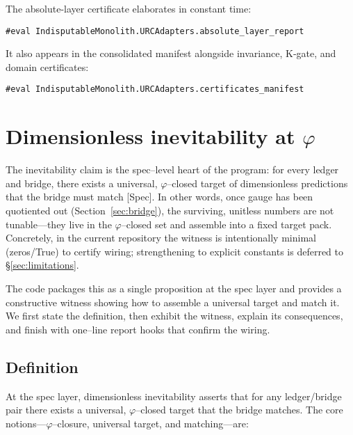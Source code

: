 \documentclass[11pt,a4paper,twoside]{article}
\numberwithin{equation}{section}
\newcommand{\phigr}{\varphi} %
\theoremstyle{customthm}
\theoremstyle{customdef}
\theoremstyle{customrem}
\begin{document}
\noindent The absolute-layer certificate elaborates in constant time:
\begin{lstlisting}
#eval IndisputableMonolith.URCAdapters.absolute_layer_report
\end{lstlisting}

\noindent It also appears in the consolidated manifest alongside invariance, K‑gate, and domain certificates:
\begin{lstlisting}
#eval IndisputableMonolith.URCAdapters.certificates_manifest
\end{lstlisting}

\section{Dimensionless inevitability at $\phigr$}\label{sec:phi}

The inevitability claim is the spec–level heart of the program: for every ledger and bridge, there exists a universal, $\phigr$–closed target of dimensionless predictions that the bridge must match [Spec]. In other words, once gauge has been quotiented out (Section~\ref{sec:bridge}), the surviving, unitless numbers are not tunable—they live in the $\phigr$–closed set and assemble into a fixed target pack. Concretely, in the current repository the witness is intentionally minimal (zeros/True) to certify wiring; strengthening to explicit constants is deferred to \S\ref{sec:limitations}.

The code packages this as a single proposition at the spec layer and provides a constructive witness showing how to assemble a universal target and match it. We first state the definition, then exhibit the witness, explain its consequences, and finish with one–line report hooks that confirm the wiring.

\subsection{Definition}

At the spec layer, dimensionless inevitability asserts that for any ledger/bridge pair there exists a universal, $\phigr$–closed target that the bridge matches. The core notions—$\phigr$–closure, universal target, and matching—are:
\end{document}
